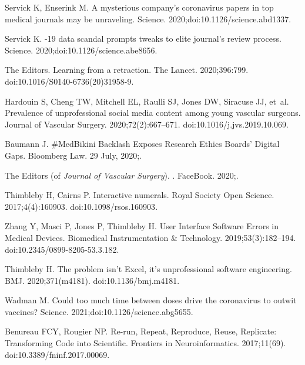 \documentclass[10pt,letterpaper]{article}
\begin{document}
{\begin{thebibliography}{10}
Servick K, Enserink M.
\newblock A mysterious company's coronavirus papers in top medical journals may
  be unraveling.
\newblock Science. 2020;doi:{10.1126/science.abd1337}.

Servick K.
-19 data scandal prompts tweaks to elite journal's review
  process.
\newblock Science. 2020;doi:{10.1126/science.abe8656}.

{The Editors}.
\newblock Learning from a retraction.
\newblock The Lancet. 2020;396:799.
\newblock doi:{10.1016/S0140-6736(20)31958-9}.

Hardouin S, Cheng TW, Mitchell EL, Raulli SJ, Jones DW, Siracuse JJ, et~al.
\newblock Prevalence of unprofessional social media content among young
  vascular surgeons.
\newblock Journal of Vascular Surgery. 2020;72(2):667--671.
\newblock doi:{10.1016/j.jvs.2019.10.069}.

Baumann J.
\newblock \#{MedBikini} Backlash Exposes Research Ethics Boards' Digital Gaps.
\newblock Bloomberg Law. 29 July, 2020;.

{The Editors {(of \emph{Journal of Vascular Surgery\/})}}.
.
\newblock FaceBook. 2020;.

Thimbleby H, Cairns P.
\newblock Interactive numerals.
\newblock Royal Society Open Science. 2017;4(4):160903.
\newblock doi:{10.1098/rsos.160903}.

Zhang Y, Masci P, Jones P, Thimbleby H.
\newblock User Interface Software Errors in Medical Devices.
\newblock Biomedical Instrumentation {\&} Technology. 2019;53(3):182--194.
\newblock doi:{10.2345/0899-8205-53.3.182}.

Thimbleby H.
\newblock The problem isn't {Excel}, it's unprofessional software engineering.
\newblock BMJ. 2020;371(m4181).
\newblock doi:{10.1136/bmj.m4181}.

Wadman M.
\newblock Could too much time between doses drive the coronavirus to outwit
  vaccines?
\newblock Science. 2021;doi:{10.1126/science.abg5655}.

Benureau FCY, Rougier NP.
\newblock Re-run, Repeat, Reproduce, Reuse, Replicate: {Transforming} Code into
  Scientific.
\newblock Frontiers in Neuroinformatics. 2017;11(69).
\newblock doi:{10.3389/fninf.2017.00069}.


\end{thebibliography}}
\end{document}
